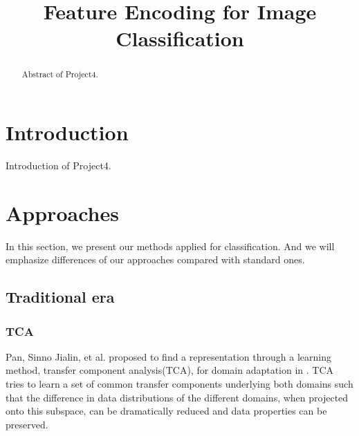 \documentclass[conference]{IEEEtran}
\begin{document}
\title{Feature Encoding for Image Classification\\
}

\author{
\and
{}
\and
{}
}

\maketitle

\begin{abstract}
Abstract of Project4.
\end{abstract}



\section{Introduction}
Introduction of Project4.


\section{Approaches}
In this section, we present our methods applied for classification. And we will emphasize differences of our approaches compared with standard ones.
\subsection{Traditional era}
\subsubsection{TCA}
Pan, Sinno Jialin, et al. proposed to find a representation through a learning method, transfer component analysis(TCA), for domain adaptation in \cite{TCA}. TCA tries to learn a set of common transfer components underlying both domains such that the difference in data distributions of the different domains, when projected onto this subspace, can be dramatically reduced and data properties can be preserved.
\end{document}
